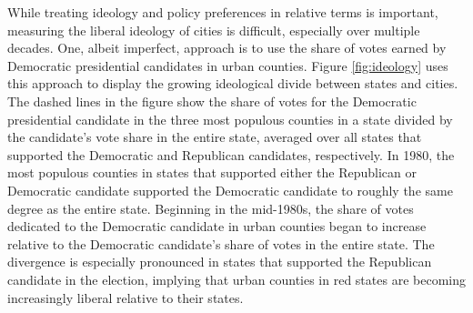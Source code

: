\documentclass[12pt]{article}
\begin{document}
While treating ideology and policy preferences in relative terms is important, measuring the liberal ideology of cities is difficult, especially over multiple decades. One, albeit imperfect, approach is to use the share of votes earned by Democratic presidential candidates in urban counties. Figure \ref{fig:ideology} uses this approach to display the growing ideological divide between states and cities. The dashed lines in the figure show the share of votes for the Democratic presidential candidate in the three most populous counties in a state divided by the candidate's vote share in the entire state, averaged over all states that supported the Democratic and Republican candidates, respectively. In 1980, the most populous counties in states that supported either the Republican or Democratic candidate supported the Democratic candidate to roughly the same degree as the entire state. Beginning in the mid-1980s, the share of votes dedicated to the Democratic candidate in urban counties began to increase relative to the Democratic candidate's share of votes in the entire state. The divergence is especially pronounced in states that supported the Republican candidate in the election, implying that urban counties in red states are becoming increasingly liberal relative to their states.  
\end{document}
